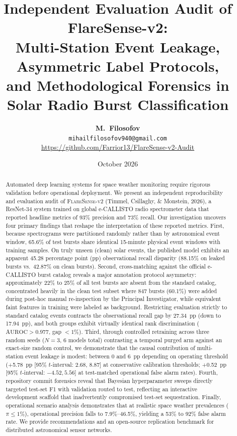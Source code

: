 \documentclass[11pt,a4paper]{article}
\title{\textbf{Independent Evaluation Audit of FlareSense-v2:\\Multi-Station Event Leakage, Asymmetric Label Protocols,\\and Methodological Forensics in Solar Radio Burst Classification}}
\author{
  \textbf{M.~Filosofov}\\
  \texttt{mihailfilosofov940@gmail.com}\\
  \url{https://github.com/Farrior13/FlareSense-v2-Audit}
}
\date{October 2026}
\begin{document}
\maketitle

\begin{abstract}
Automated deep learning systems for space weather monitoring require rigorous validation before operational deployment. We present an independent reproducibility and evaluation audit of \textsc{FlareSense-v2} (Timmel, Csillaghy, \& Monstein, 2026), a ResNet-34 system trained on global e-CALLISTO radio spectrometer data that reported headline metrics of 93\% precision and 73\% recall. 
Our investigation uncovers four primary findings that reshape the interpretation of these reported metrics.
First, because spectrograms were partitioned randomly rather than by astronomical event window, 65.6\% of test bursts share identical 15-minute physical event windows with training samples. On truly unseen (clean) solar events, the published model exhibits an apparent 45.28 percentage point (pp) observational recall disparity (88.15\% on leaked bursts vs.\ 42.87\% on clean bursts).
Second, cross-matching against the official e-CALLISTO burst catalog reveals a major annotation protocol asymmetry: approximately 22\% to 25\% of all test bursts are absent from the standard catalog, concentrated heavily in the clean test subset where 847 bursts (60.1\%) were added during post-hoc manual re-inspection by the Principal Investigator, while equivalent faint features in training were labeled as background. Restricting evaluation strictly to standard catalog events contracts the observational recall gap by 27.34~pp (down to 17.94~pp), and both groups exhibit virtually identical rank discrimination ($\text{AUROC} > 0.977$, gap $< 1\%$).
Third, through controlled retraining across three random seeds ($N=3$, 6 models total) contrasting a temporal purged arm against an exact-size random control, we demonstrate that the causal contribution of multi-station event leakage is modest: between 0 and 6~pp depending on operating threshold (+5.78~pp [95\% $t$-interval: 2.68, 8.87] at conservative calibration thresholds; +0.52~pp [95\% $t$-interval: $-4.52, 5.56$] at test-matched operational false alarm rates).
Fourth, repository commit forensics reveal that Bayesian hyperparameter sweeps directly targeted test-set F1 with validation routed to test, reflecting an interactive development scaffold that inadvertently compromised test-set sequestration.
Finally, operational scenario analysis demonstrates that at realistic space weather prevalences ($\pi \le 1\%$), operational precision falls to 7.9\%--46.5\%, yielding a 53\% to 92\% false alarm rate. We provide recommendations and an open-source replication benchmark for distributed astronomical sensor networks.
\end{abstract}
\end{document}
